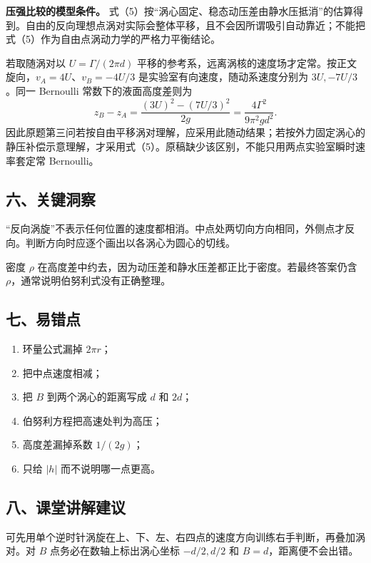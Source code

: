 \documentclass[12pt,a4paper,UTF8]{ctexart}
\newcommand{\tightlist}{\setlength{\itemsep}{0pt}\setlength{\parskip}{0pt}}
\begin{document}
\textbf{压强比较的模型条件。}
式（5）按``涡心固定、稳态动压差由静水压抵消''的估算得到。自由的反向理想点涡对实际会整体平移，且不会因所谓吸引自动靠近；不能把式（5）作为自由点涡动力学的严格力平衡结论。

若取随涡对以 \(U=\Gamma/(2\pi d)\)
平移的参考系，远离涡核的速度场才定常。按正文旋向，\(v_A=4U\)、\(v_B=-4U/3\)
是实验室有向速度，随动系速度分别为 \(3U,-7U/3\)。同一 Bernoulli
常数下的液面高度差则为 \[
z_B-z_A=\frac{(3U)^2-(7U/3)^2}{2g}
=\frac{4\Gamma^2}{9\pi^2gd^2}.
\]
因此原题第三问若按自由平移涡对理解，应采用此随动结果；若按外力固定涡心的静压补偿示意理解，才采用式（5）。原稿缺少该区别，不能只用两点实验室瞬时速率套定常
Bernoulli。

\subsection{六、关键洞察}\label{ux516dux5173ux952eux6d1eux5bdf-2}

``反向涡旋''不表示任何位置的速度都相消。中点处两切向方向相同，外侧点才反向。判断方向时应逐个画出以各涡心为圆心的切线。

密度 \(\rho\)
在高度差中约去，因为动压差和静水压差都正比于密度。若最终答案仍含
\(\rho\)，通常说明伯努利式没有正确整理。

\subsection{七、易错点}\label{ux4e03ux6613ux9519ux70b9-2}

\begin{enumerate}
\def\labelenumi{\arabic{enumi}.}
\tightlist
\item
  环量公式漏掉 \(2\pi r\)；
\item
  把中点速度相减；
\item
  把 \(B\) 到两个涡心的距离写成 \(d\) 和 \(2d\)；
\item
  伯努利方程把高速处判为高压；
\item
  高度差漏掉系数 \(1/(2g)\)；
\item
  只给 \(|h|\) 而不说明哪一点更高。
\end{enumerate}

\subsection{八、课堂讲解建议}\label{ux516bux8bfeux5802ux8bb2ux89e3ux5efaux8bae-2}

可先用单个逆时针涡旋在上、下、左、右四点的速度方向训练右手判断，再叠加涡对。对
\(B\) 点务必在数轴上标出涡心坐标 \(-d/2,d/2\) 和
\(B=d\)，距离便不会出错。
\end{document}

